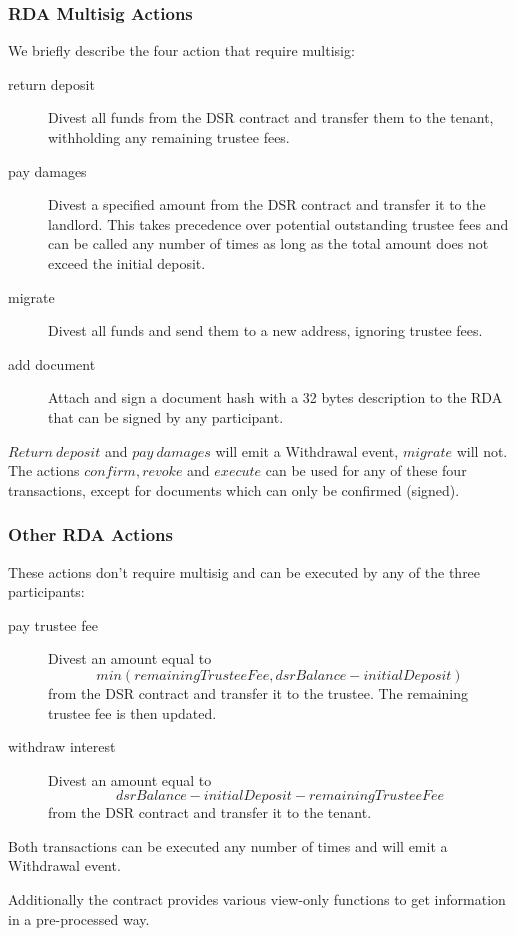 \documentclass[12pt,a4paper,titlepage,oneside,english]{article}
\begin{document}
\subsubsection{RDA Multisig Actions}
We briefly describe the four action that require multisig:

\begin{description}
	\item[return deposit] Divest all funds from the DSR contract and transfer them to the tenant, withholding any remaining trustee fees.
	\item[pay damages] Divest a specified amount from the DSR contract and transfer it to the landlord. This takes precedence over potential outstanding trustee fees and can be called any number of times as long as the total amount does not exceed the initial deposit.
	\item[migrate] Divest all funds and send them to a new address, ignoring trustee fees.
	\item[add document] Attach and sign a document hash with a 32 bytes description to the RDA that can be signed by any participant.
\end{description}

$Return~ deposit$ and $pay~ damages$ will emit a Withdrawal event, $migrate$ will not. The actions $confirm, revoke$ and $execute$ can be used for any of these four transactions, except for documents which can only be confirmed (signed).

\subsubsection{Other RDA Actions}
These actions don't require multisig and can be executed by any of the three participants:
\begin{description}
	\item[pay trustee fee] Divest an amount equal to 
	$$min(remainingTrusteeFee, dsrBalance - initialDeposit)$$ 
	from the DSR contract and transfer it to the trustee. The remaining trustee fee is then updated.
	\item[withdraw interest] Divest an amount equal to 
	$$dsrBalance - initialDeposit - remainingTrusteeFee$$ 
	from the DSR contract and transfer it to the tenant.
\end{description}

Both transactions can be executed any number of times and will emit a Withdrawal event.

Additionally the contract provides various view-only functions to get information in a pre-processed way.
\end{document}
